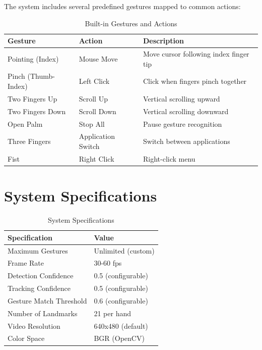 \documentclass[12pt,a4paper]{report}
\begin{document}
The system includes several predefined gestures mapped to common actions:

\begin{table}[H]
\centering
\caption{Built-in Gestures and Actions}
\label{tab:builtin_gestures}
\begin{tabular}{|l|l|p{6cm}|}
\hline
\textbf{Gesture} & \textbf{Action} & \textbf{Description} \\ \hline
Pointing (Index) & Mouse Move & Move cursor following index finger tip \\ \hline
Pinch (Thumb-Index) & Left Click & Click when fingers pinch together \\ \hline
Two Fingers Up & Scroll Up & Vertical scrolling upward \\ \hline
Two Fingers Down & Scroll Down & Vertical scrolling downward \\ \hline
Open Palm & Stop All & Pause gesture recognition \\ \hline
Three Fingers & Application Switch & Switch between applications \\ \hline
Fist & Right Click & Right-click menu \\ \hline
\end{tabular}
\end{table}

\section{System Specifications}

\begin{table}[H]
\centering
\caption{System Specifications}
\label{tab:system_specs}
\begin{tabular}{|l|l|}
\hline
\textbf{Specification} & \textbf{Value} \\ \hline
Maximum Gestures & Unlimited (custom) \\ \hline
Frame Rate & 30-60 fps \\ \hline
Detection Confidence & 0.5 (configurable) \\ \hline
Tracking Confidence & 0.5 (configurable) \\ \hline
Gesture Match Threshold & 0.6 (configurable) \\ \hline
Number of Landmarks & 21 per hand \\ \hline
Video Resolution & 640x480 (default) \\ \hline
Color Space & BGR (OpenCV) \\ \hline
\end{tabular}
\end{table}
\end{document}
